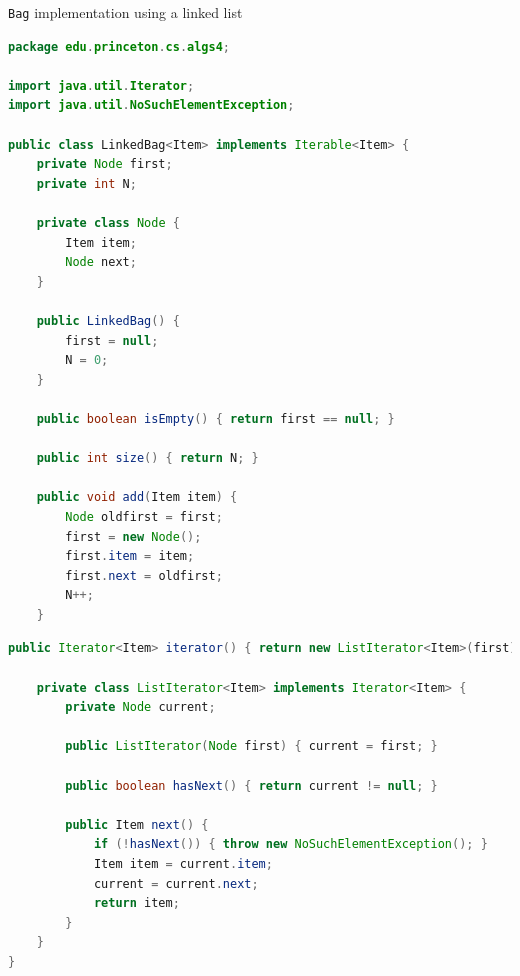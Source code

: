 \documentclass[8pt,a4paper,compress]{beamer}
\begin{document}
\begin{frame}[fragile]
\pause

\lstinline{Bag} implementation using a linked list
\begin{lstlisting}[language=Java]
package edu.princeton.cs.algs4;

import java.util.Iterator;
import java.util.NoSuchElementException;

public class LinkedBag<Item> implements Iterable<Item> {
    private Node first;
    private int N;

    private class Node {
        Item item;
        Node next;
    }

    public LinkedBag() {
        first = null;
        N = 0;
    }

    public boolean isEmpty() { return first == null; }

    public int size() { return N; }

    public void add(Item item) {
        Node oldfirst = first;
        first = new Node();
        first.item = item;
        first.next = oldfirst;
        N++;
    }
\end{lstlisting}
\end{frame}

\begin{frame}[fragile]
\pause

\begin{lstlisting}[language=Java]
    public Iterator<Item> iterator() { return new ListIterator<Item>(first); }

    private class ListIterator<Item> implements Iterator<Item> {
        private Node current;

        public ListIterator(Node first) { current = first; }

        public boolean hasNext() { return current != null; }

        public Item next() {
            if (!hasNext()) { throw new NoSuchElementException(); }
            Item item = current.item;
            current = current.next; 
            return item;
        }
    }
}
\end{lstlisting}
\end{frame}
\end{document}
